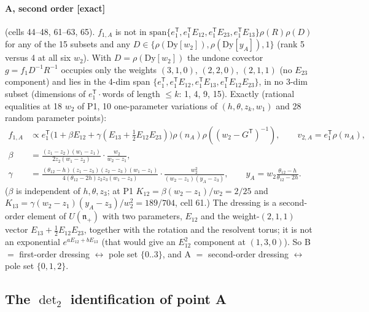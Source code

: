 \documentclass[11pt]{article}
\newcommand{\eT}{e_1^{\mathsf T}}
\newcommand{\thh}{\theta_{12}}
\newcommand{\ex}{\textbf{[exact]}}
\begin{document}
\paragraph{A, second order \ex} (cells 44--48, 61--63, 65). $f_{1,A}$ is not in $\mathrm{span}\{\eT,\eT E_{12},\eT E_{23},\eT E_{13}\}\rho(R)\rho(D)$ for any of the 15 subsets and any $D\in\{\rho(\mathrm{Dy}[w_2]),\rho(\mathrm{Dy}[y_A]),1\}$ (rank 5 versus 4 at all six $w_2$). With $D=\rho(\mathrm{Dy}[w_2])$ the undone covector $g=f_1D^{-1}R^{-1}$ occupies only the weights $(3,1,0)$, $(2,2,0)$, $(2,1,1)$ (no $E_{23}$ component) and lies in the 4-dim span $\{\eT,\eT E_{12},\eT E_{13},\eT E_{12}E_{23}\}$, in no 3-dim subset (dimensions of $\eT\cdot$words of length $\le k$: 1, 4, 9, 15). Exactly (rational equalities at 18 $w_2$ of P1, 10 one-parameter variations of $(h,\theta,z_k,w_1)$ and 28 random parameter points):
\begin{align}
f_{1,A}&\propto\eT\big(1+\beta E_{12}+\gamma(E_{13}+\tfrac12E_{12}E_{23})\big)\rho(n_A)\rho((w_2-G^{\mathsf T})^{-1}),\qquad v_{2,A}=\eT\rho(n_A),\nonumber\\
\beta&=\frac{(z_1-z_2)(w_1-z_1)}{2z_2(w_1-z_2)}\cdot\frac{w_2}{w_2-z_1},\nonumber\\
\gamma&=\frac{(\thh-h)(z_1-z_3)(z_2-z_3)(w_1-z_1)}{4(\thh-2h)z_2z_3(w_1-z_3)}\cdot\frac{w_2^2}{(w_2-z_1)(y_A-z_3)},\qquad y_A=w_2\frac{\thh-h}{\thh-2h}.
\end{align}
($\beta$ is independent of $h,\theta,z_3$; at P1 $K_{12}=\beta(w_2-z_1)/w_2=2/25$ and $K_{13}=\gamma(w_2-z_1)(y_A-z_3)/w_2^2=189/704$, cell 61.) The dressing is a second-order element of $U(\mathfrak n_+)$ with two parameters, $E_{12}$ and the weight-$(2,1,1)$ vector $E_{13}+\tfrac12E_{12}E_{23}$, together with the rotation and the resolvent torus; it is not an exponential $e^{aE_{12}+bE_{13}}$ (that would give an $E_{12}^2$ component at $(1,3,0)$). So B $=$ first-order dressing $\leftrightarrow$ pole set $\{0..3\}$, and A $=$ second-order dressing $\leftrightarrow$ pole set $\{0,1,2\}$.

\subsection{The $\det_2$ identification of point A}
\end{document}
